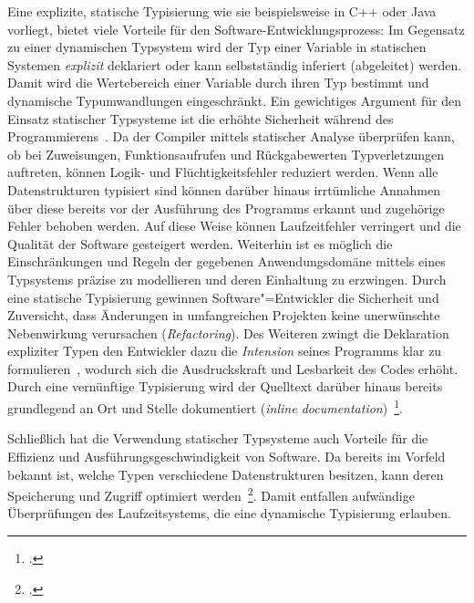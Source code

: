 Eine explizite, statische Typisierung wie sie beispielsweise in C++ oder Java vorliegt, bietet viele Vorteile für den Software-Entwicklungsprozess: Im Gegensatz zu einer dynamischen Typsystem wird der Typ einer Variable in statischen Systemen \emph{explizit} deklariert oder kann selbstständig inferiert (abgeleitet) werden. Damit wird die Wertebereich einer Variable durch ihren Typ bestimmt und dynamische Typumwandlungen eingeschränkt.
Ein gewichtiges Argument für den Einsatz statischer Typsysteme ist die erhöhte Sicherheit während des Programmierens~\autocite{CORNELL:STRONG_TYPING}. Da der Compiler mittels statischer Analyse überprüfen kann, ob bei Zuweisungen, Funktionsaufrufen und Rückgabewerten Typverletzungen auftreten, können Logik- und Flüchtigkeitsfehler reduziert werden. Wenn alle Datenstrukturen typisiert sind können darüber hinaus irrtümliche Annahmen über diese bereits vor der Ausführung des Programms erkannt und zugehörige Fehler behoben werden. Auf diese Weise können Laufzeitfehler verringert und die Qualität der Software gesteigert werden. Weiterhin ist es möglich die Einschränkungen und Regeln der gegebenen Anwendungsdomäne mittels eines Typsystems präzise zu modellieren und deren Einhaltung zu erzwingen. Durch eine statische Typisierung gewinnen Software"=Entwickler die Sicherheit und Zuversicht, dass Änderungen in umfangreichen Projekten keine unerwünschte Nebenwirkung verursachen (\textit{Refactoring}).
Des Weiteren zwingt die Deklaration expliziter Typen den Entwickler dazu die \emph{Intension} seines Programms klar zu formulieren~\autocite[96]{WALDMANN:PPS}, wodurch sich die Ausdruckskraft und Lesbarkeit des Codes erhöht. Durch eine vernünftige Typisierung wird der Quelltext darüber hinaus bereits grundlegend an Ort und Stelle dokumentiert (\textit{inline documentation})~\footcite[Abschnitt 6.1.1]{MITCHELL:CONCEPTS}.

Schließlich hat die Verwendung statischer Typsysteme auch Vorteile für die Effizienz und Ausführungsgeschwindigkeit von Software. Da bereits im Vorfeld bekannt ist, welche Typen verschiedene Datenstrukturen besitzen, kann deren Speicherung und Zugriff optimiert werden~\footcite[Abschnitt 6.1.3]{MITCHELL:CONCEPTS}. Damit entfallen aufwändige Überprüfungen des Laufzeitsystems, die eine dynamische Typisierung erlauben.

